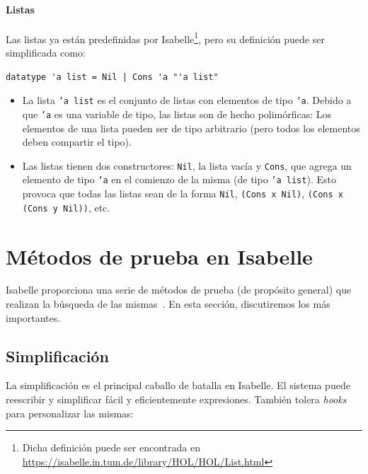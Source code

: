 \documentclass[12pt]{book}
\begin{document}
\paragraph{Listas}

Las listas ya están predefinidas por Isabelle\footnote{Dicha definición puede ser encontrada en \url{https://isabelle.in.tum.de/library/HOL/HOL/List.html}}, pero su definición puede ser simplificada como:

\begin{lstlisting}[style=Isabelle]
datatype 'a list = Nil | Cons 'a "'a list"
\end{lstlisting}

\begin{itemize}
	\item La lista \texttt{'a list} es el conjunto de listas con elementos de tipo \texttt{'a}. Debido a que \texttt{'a} es una variable de tipo, las listas son de hecho polimórficas: Los elementos de una lista pueden ser de tipo arbitrario (pero todos los elementos deben compartir el tipo).

	\item Las listas tienen dos constructores: \texttt{Nil}, la lista vacía y \texttt{Cons}, que agrega un elemento de tipo \texttt{'a} en el comienzo de la misma (de tipo \texttt{'a list}). Esto provoca que todas las listas sean de la forma \texttt{Nil}, \texttt{(Cons x Nil)}, \texttt{(Cons x (Cons y Nil))}, etc.
\end{itemize}


\section{Métodos de prueba en Isabelle}

Isabelle proporciona una serie de métodos de prueba (de propósito general) que realizan la búsqueda de las mismas~\cite{proof_and_disproof}. En esta sección, discutiremos los más importantes.

\subsection{Simplificación}

La simplificación es el principal caballo de batalla en Isabelle. El sistema puede reescribir y simplificar fácil y eficientemente expresiones. También tolera \textit{hooks} para personalizar las mismas:
\end{document}
